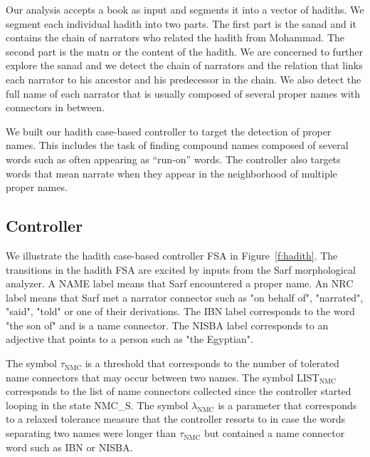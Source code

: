 \documentclass[11pt,letterpaper]{article}
\begin{document}

Our analysis accepts a book as input
and segments it into a vector of hadiths. 
We segment each individual hadith into two parts. 
The first part is the sanad and it
contains the chain of narrators who related the hadith
from Mohammad. 
The second part is the matn or the content
of the hadith. 
We are concerned to further explore the sanad and
we detect the chain of narrators and 
the relation that links each narrator to his ancestor and 
his predecessor in the chain. 
We also detect the full name of each narrator that is
usually composed of several proper names with connectors
in between. 

We built our hadith case-based controller to target
the detection of proper names. 
This includes the task of finding compound names 
composed of several words such as  often
appearing as ``run-on'' words.
The controller also targets words that mean narrate when
they appear in the neighborhood of multiple proper names. 

\subsection{Controller}
\label{sec:controller}

We illustrate the hadith case-based controller FSA 
in Figure~\ref{f:hadith}. 
The transitions in the hadith FSA are excited
by inputs from the Sarf morphological analyzer. 
A NAME label means that Sarf encountered a proper name.
An NRC label means that Sarf met a narrator connector such as
 "on behalf of",  "narrated",  "said", 
 "told" or one of their derivations. 
The IBN label corresponds to the word  "the son of" and is a name connector.
The NISBA label corresponds to an adjective that points to a person such 
as  "the Egyptian". 

The symbol $\tau_{\mbox{NMC}}$ is a threshold
that corresponds to the number of tolerated name connectors 
that may occur between two names. 
The symbol LIST$_{\mbox{NMC}}$ corresponds to the list 
of name connectors collected since the controller
started looping in the state NMC\_S. 
The symbol $\lambda_{\mbox{NMC}}$ is a parameter 
that corresponds to a relaxed tolerance measure that
the controller resorts to in case the words separating
two names were longer than $\tau_{\mbox{NMC}}$ but 
contained a name connector word such as IBN or NISBA.
\end{document}
